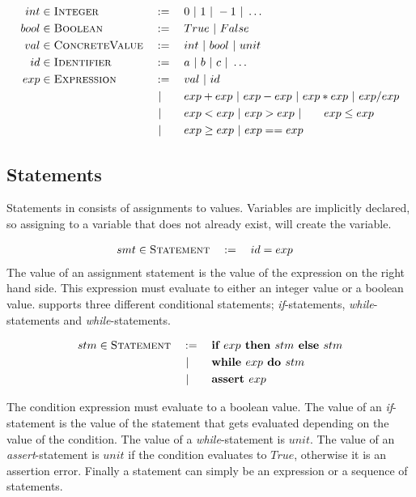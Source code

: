 \begin{alignat*}{3}
	int & \in \textsc{Integer} && := \quad 0 \ | \  1 \ | \  -1 \ | \  \ldots\\
	bool & \in \textsc{Boolean} && := \quad True \ | \  False\\
	val & \in \textsc{ConcreteValue} && := \quad int \ | \  bool \ | \  unit\\
	id & \in \textsc{Identifier} && := \quad a \ | \  b \ | \  c \ | \  \ldots \\
	exp & \in \textsc{Expression} && := \quad val \ | \  id\\ & && \ | \  \quad \ \ exp + exp \ | \  exp - exp \ | \  exp * exp \ | \  exp / exp\\
	& && \ | \  \quad \ \ exp < exp \ | \  exp > exp \ | \  \quad \ \ exp \leq exp\\
	& &&  \ | \  \quad \ \ exp \geq exp \ | \  exp == exp
\end{alignat*}


\subsection{Statements}
Statements in \explanguage consists of assignments to values. Variables are implicitly declared, so assigning to a variable that does not already exist, will create the variable. 

\begin{alignat*}{3}
	smt & \in \textsc{Statement} && := \quad id  = exp 
\end{alignat*} 
The value of an assignment statement is the value of the expression on the right hand side. This expression must evaluate to either an integer value or a boolean value. \explanguage supports three different conditional statements;  \textsl{if}-statements, \textsl{while}-statements and \textsl{while}-statements. 

\begin{alignat*}{3}
	stm & \in \textsc{Statement} && := \quad \textbf{if }  exp \textbf{ then } stm \textbf{ else } stm\\
	& && \ | \  \quad \ \ \textbf{while } exp \textbf{ do } stm\\
	& && \ | \  \quad \ \ \textbf{assert } exp
\end{alignat*}

The condition expression must evaluate to a boolean value. The value of an \textsl{if}-statement is the value of the statement that gets evaluated depending on the value of the condition. The value of a \textsl{while}-statement is $unit$. The value of an \textsl{assert}-statement is $unit$ if the condition evaluates to $True$, otherwise it is an assertion error. Finally a statement can simply be an expression or a sequence of statements. 

